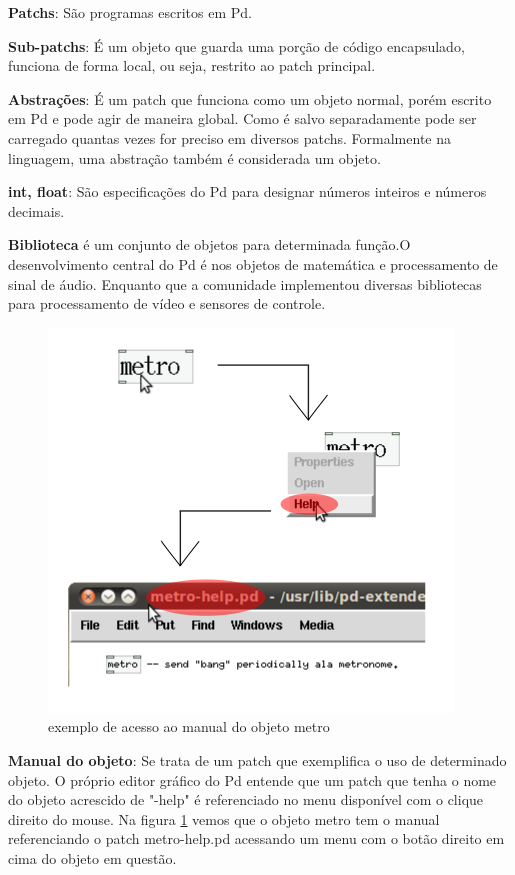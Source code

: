 \documentclass[draft]{ppgmus}
\begin{document}
\textbf{Patchs}: São programas escritos em Pd.

\textbf{Sub-patchs}: É um objeto que guarda uma porção de código encapsulado, funciona
de forma local, ou seja, restrito ao patch principal.

\textbf{Abstrações}: É um patch que funciona como um objeto normal, porém escrito em Pd e pode agir de maneira global.
Como é salvo separadamente pode ser carregado quantas vezes for preciso em diversos patchs. Formalmente na linguagem,
 uma abstração também é considerada um objeto.

\textbf{int, float}: São especificações do Pd para designar números inteiros e números decimais.

\textbf{Biblioteca} é um conjunto de objetos para determinada função.O desenvolvimento
central do Pd é nos objetos de matemática e processamento de sinal de áudio. Enquanto
que a comunidade implementou diversas bibliotecas para processamento de vídeo e sensores
de controle. 


\begin{figure}
\includegraphics[scale=.6]{help}
\caption{exemplo de acesso ao manual do objeto metro}
\label{help}
\end{figure}


\textbf{Manual do objeto}: Se trata de um patch que exemplifica o uso de determinado
objeto. O próprio editor gráfico do Pd entende que um patch que tenha o nome do objeto 
acrescido de "-help" é referenciado no menu disponível com o clique direito do mouse. 
Na figura \ref{help} vemos que o objeto metro tem o manual
referenciando o patch metro-help.pd acessando um 
menu com o botão direito em cima do objeto em questão.
\end{document}
